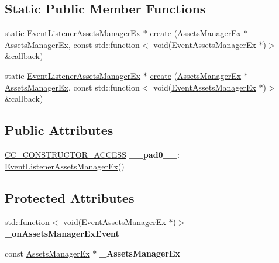 \subsection*{Static Public Member Functions}
\begin{DoxyCompactItemize}
\item 
static \hyperlink{classEventListenerAssetsManagerEx}{Event\+Listener\+Assets\+Manager\+Ex} $\ast$ \hyperlink{classEventListenerAssetsManagerEx_ab3d0581850c89016c1b9737c75e110ac}{create} (\hyperlink{classAssetsManagerEx}{Assets\+Manager\+Ex} $\ast$\hyperlink{classAssetsManagerEx}{Assets\+Manager\+Ex}, const std\+::function$<$ void(\hyperlink{classEventAssetsManagerEx}{Event\+Assets\+Manager\+Ex} $\ast$)$>$ \&callback)
\item 
static \hyperlink{classEventListenerAssetsManagerEx}{Event\+Listener\+Assets\+Manager\+Ex} $\ast$ \hyperlink{classEventListenerAssetsManagerEx_ab3d0581850c89016c1b9737c75e110ac}{create} (\hyperlink{classAssetsManagerEx}{Assets\+Manager\+Ex} $\ast$\hyperlink{classAssetsManagerEx}{Assets\+Manager\+Ex}, const std\+::function$<$ void(\hyperlink{classEventAssetsManagerEx}{Event\+Assets\+Manager\+Ex} $\ast$)$>$ \&callback)
\end{DoxyCompactItemize}
\subsection*{Public Attributes}
\begin{DoxyCompactItemize}
\item 
\mbox{\label{classEventListenerAssetsManagerEx_ab0ae19d3c6ef6df0d57cefeb3161ee9e}} 
\hyperlink{_2cocos2d_2cocos_2base_2ccConfig_8h_a25ef1314f97c35a2ed3d029b0ead6da0}{C\+C\+\_\+\+C\+O\+N\+S\+T\+R\+U\+C\+T\+O\+R\+\_\+\+A\+C\+C\+E\+SS} {\bfseries \+\_\+\+\_\+pad0\+\_\+\+\_\+}\+: \hyperlink{classEventListenerAssetsManagerEx}{Event\+Listener\+Assets\+Manager\+Ex}()
\end{DoxyCompactItemize}
\subsection*{Protected Attributes}
\begin{DoxyCompactItemize}
\item 
\mbox{\label{classEventListenerAssetsManagerEx_a04d325b9fa8542f752077f27ecc94cb7}} 
std\+::function$<$ void(\hyperlink{classEventAssetsManagerEx}{Event\+Assets\+Manager\+Ex} $\ast$)$>$ {\bfseries \+\_\+on\+Assets\+Manager\+Ex\+Event}
\item 
\mbox{\label{classEventListenerAssetsManagerEx_adf62691e5640074e9eb69cf9d425dfaf}} 
const \hyperlink{classAssetsManagerEx}{Assets\+Manager\+Ex} $\ast$ {\bfseries \+\_\+\+Assets\+Manager\+Ex}
\end{DoxyCompactItemize}
